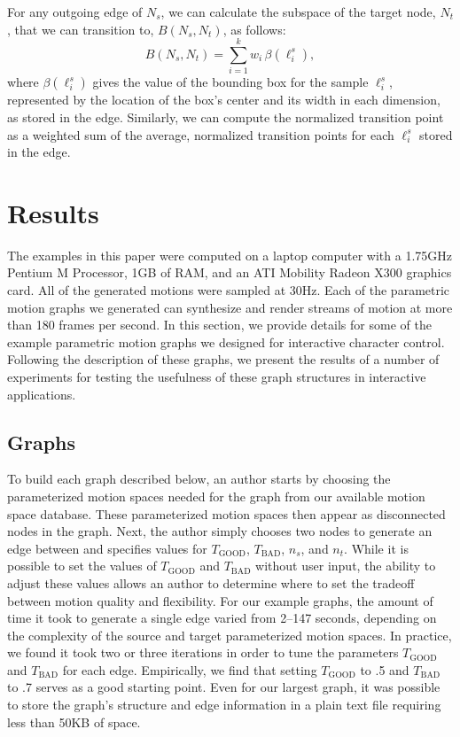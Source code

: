\documentclass[10pt,twocolumn]{article}
\begin{document}
For any outgoing edge of $N_s$, we can calculate the subspace of the target node, $N_t$, that we can transition to, $B(N_s,N_t)$, as follows:
\begin{equation}
B(N_s,N_t) =
\sum_{i=1}^{k} w_i \, \beta(\ell_i^s),
\label{eq:bounding-box}
\end{equation}
where $\beta(\ell_i^s)$ gives the value of the bounding box for the sample $\ell_i^s$, represented by the location of the box's center and its width in each dimension, as stored in the edge. Similarly, we can compute the normalized transition point as a weighted sum of the average, normalized transition points for each $\ell_i^s$ stored in the edge.

\section{Results}
\label{sec:results}

The examples in this paper were computed on a laptop computer with a 1.75GHz Pentium M Processor, 1GB of RAM, and an ATI Mobility Radeon X300 graphics card. All of the generated motions were sampled at 30Hz. Each of the parametric motion graphs we generated can synthesize and render streams of motion at more than 180 frames per second. In this section, we provide details for some of the example parametric motion graphs we designed for interactive character control. Following the description of these graphs, we present the results of a number of experiments for testing the usefulness of these graph structures in interactive applications.

\subsection{Graphs}

To build each graph described below, an author starts by choosing the parameterized motion spaces needed for the graph from our available motion space database. These parameterized motion spaces then appear as disconnected nodes in the graph. Next, the author simply chooses two nodes to generate an edge between and specifies values for $T_{\mathrm{GOOD}}$, $T_{\mathrm{BAD}}$, $n_s$, and $n_t$. While it is possible to set the values of $T_{\mathrm{GOOD}}$ and $T_{\mathrm{BAD}}$ without user input, the ability to adjust these values allows an author to determine where to set the tradeoff between motion quality and flexibility. For our example graphs, the amount of time it took to generate a single edge varied from 2--147 seconds, depending on the complexity of the source and target parameterized motion spaces. In practice, we found it took two or three iterations in order to tune the parameters $T_{\mathrm{GOOD}}$ and $T_{\mathrm{BAD}}$ for each edge. Empirically, we find that setting $T_{\mathrm{GOOD}}$ to .5 and $T_{\mathrm{BAD}}$ to .7 serves as a good starting point. Even for our largest graph, it was possible to store the graph's structure and edge information in a plain text file requiring less than 50KB of space.
\end{document}

